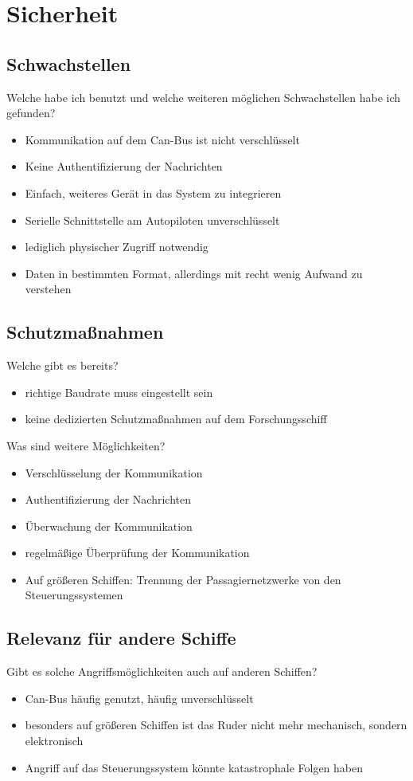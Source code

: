 \chapter{Sicherheit}

\section{Schwachstellen}
Welche habe ich benutzt und welche weiteren möglichen Schwachstellen habe ich gefunden?
\begin{itemize}
    \item Kommunikation auf dem Can-Bus ist nicht verschlüsselt
    \item Keine Authentifizierung der Nachrichten
    \item Einfach, weiteres Gerät in das System zu integrieren
    \item Serielle Schnittstelle am Autopiloten unverschlüsselt
    \item lediglich physischer Zugriff notwendig
    \item Daten in bestimmten Format, allerdings mit recht wenig Aufwand zu verstehen
\end{itemize}
\section{Schutzmaßnahmen}
Welche gibt es bereits?
\begin{itemize}
    \item richtige Baudrate muss eingestellt sein
    \item keine dedizierten Schutzmaßnahmen auf dem Forschungsschiff
\end{itemize}
Was sind weitere Möglichkeiten?
\begin{itemize}
    \item Verschlüsselung der Kommunikation
    \item Authentifizierung der Nachrichten
    \item Überwachung der Kommunikation
    \item regelmäßige Überprüfung der Kommunikation
    \item Auf größeren Schiffen: Trennung der Passagiernetzwerke von den Steuerungssystemen
\end{itemize}

\section{Relevanz für andere Schiffe}
Gibt es solche Angriffsmöglichkeiten auch auf anderen Schiffen?
\begin{itemize}
    \item Can-Bus häufig genutzt, häufig unverschlüsselt
    \item besonders auf größeren Schiffen ist das Ruder nicht mehr mechanisch, sondern elektronisch
    \item Angriff auf das Steuerungssystem könnte katastrophale Folgen haben
\end{itemize}